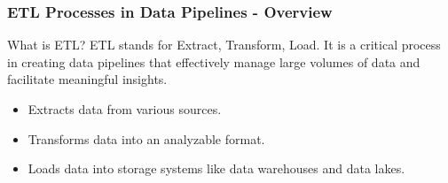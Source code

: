 \documentclass{beamer}
\begin{document}
\begin{frame}[fragile]
    \frametitle{ETL Processes in Data Pipelines - Overview}
    \begin{block}{What is ETL?}
        ETL stands for Extract, Transform, Load. It is a critical process in creating data pipelines that effectively manage large volumes of data and facilitate meaningful insights.
    \end{block}
    \begin{itemize}
        \item Extracts data from various sources.
        \item Transforms data into an analyzable format.
        \item Loads data into storage systems like data warehouses and data lakes.
    \end{itemize}
\end{frame}
\end{document}

